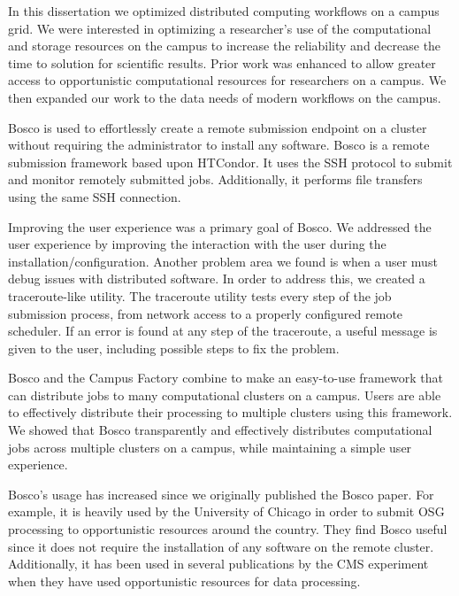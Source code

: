 \label{chapter:coordinatingstorage}

In this dissertation we optimized distributed computing workflows on a campus grid.  We were interested in optimizing a researcher's use of the computational and storage resources on the campus to increase the reliability and decrease the time to solution for scientific results.  Prior work was enhanced to allow greater access to opportunistic computational resources for researchers on a campus.  We then expanded our work to the data needs of modern workflows on the campus.

Bosco is used to effortlessly create a remote submission endpoint on a cluster without requiring the administrator to install any software.  Bosco is a remote submission framework based upon HTCondor.  It uses the SSH protocol to submit and monitor remotely submitted jobs.  Additionally, it performs file transfers using the same SSH connection.

Improving the user experience was a primary goal of Bosco.  We addressed the user experience by improving the interaction with the user during the installation/configuration.  Another problem area we found is when a user must debug issues with distributed software.  In order to address this, we created a traceroute-like utility.  The traceroute utility tests every step of the job submission process, from network access to a properly configured remote scheduler.  If an error is found at any step of the traceroute, a useful message is given to the user, including possible steps to fix the problem.

Bosco and the Campus Factory combine to make an easy-to-use framework that can distribute jobs to many computational clusters on a campus.  Users are able to effectively distribute their processing to multiple clusters using this framework.  We showed that Bosco transparently and effectively distributes computational jobs across multiple clusters on a campus, while maintaining a simple user experience.

Bosco's usage has increased since we originally published the Bosco paper.  For example, it is heavily used by the University of Chicago in order to submit OSG processing to opportunistic resources around the country.  They find Bosco useful since it does not require the installation of any software on the remote cluster.  Additionally, it has been used in several publications by the CMS experiment when they have used opportunistic resources for data processing.

